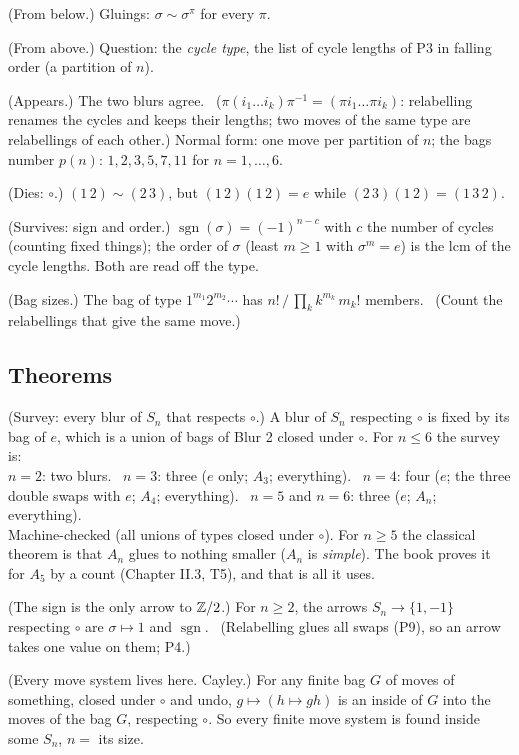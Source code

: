 \begin{lines}
\item[\lab{B3}] (From below.) Gluings: $\sigma \sim \sigma^\pi$ for every $\pi$.
\item[\lab{B4}] (From above.) Question: the \emph{cycle type}, the list of cycle lengths of P3 in falling order (a partition of $n$).
\item[\lab{P9}] (Appears.) The two blurs agree. \ ($\pi (i_1 \dots i_k) \pi^{-1} = (\pi i_1 \dots \pi i_k)$: relabelling renames the cycles and keeps their lengths; two moves of the same type are relabellings of each other.) Normal form: one move per partition of $n$; the bags number $p(n)$: $1, 2, 3, 5, 7, 11$ for $n = 1, \dots, 6$.
\item[\lab{P10}] (Dies: $\circ$.) $(1\,2) \sim (2\,3)$, but $(1\,2)(1\,2) = e$ while $(2\,3)(1\,2) = (1\,3\,2)$.
\item[\lab{P11}] (Survives: sign and order.) $\operatorname{sgn}(\sigma) = (-1)^{n - c}$ with $c$ the number of cycles (counting fixed things); the order of $\sigma$ (least $m \ge 1$ with $\sigma^m = e$) is the lcm of the cycle lengths. Both are read off the type.
\item[\lab{P12}] (Bag sizes.) The bag of type $1^{m_1} 2^{m_2} \cdots$ has $n! \,/\, \prod_k k^{m_k}\, m_k!$ members. \ (Count the relabellings that give the same move.)
\end{lines}

\subsection*{Theorems}

\begin{lines}
\item[\lab{T1}] (Survey: every blur of $S_n$ that respects $\circ$.) A blur of $S_n$ respecting $\circ$ is fixed by its bag of $e$, which is a union of bags of Blur 2 closed under $\circ$. For $n \le 6$ the survey is: \\
$n = 2$: two blurs. \ $n = 3$: three ($e$ only; $A_3$; everything). \ $n = 4$: four ($e$; the three double swaps with $e$; $A_4$; everything). \ $n = 5$ and $n = 6$: three ($e$; $A_n$; everything). \\
Machine-checked (all unions of types closed under $\circ$). For $n \ge 5$ the classical theorem is that $A_n$ glues to nothing smaller ($A_n$ is \emph{simple}). The book proves it for $A_5$ by a count (Chapter II.3, T5), and that is all it uses.
\item[\lab{T2}] (The sign is the only arrow to $\mathbb{Z}/2$.) For $n \ge 2$, the arrows $S_n \to \{1, -1\}$ respecting $\circ$ are $\sigma \mapsto 1$ and $\operatorname{sgn}$. \ (Relabelling glues all swaps (P9), so an arrow takes one value on them; P4.)
\item[\lab{T3}] (Every move system lives here. Cayley.) For any finite bag $G$ of moves of something, closed under $\circ$ and undo, $g \mapsto (h \mapsto g h)$ is an inside of $G$ into the moves of the bag $G$, respecting $\circ$. So every finite move system is found inside some $S_n$, $n = $ its size.
\end{lines}

